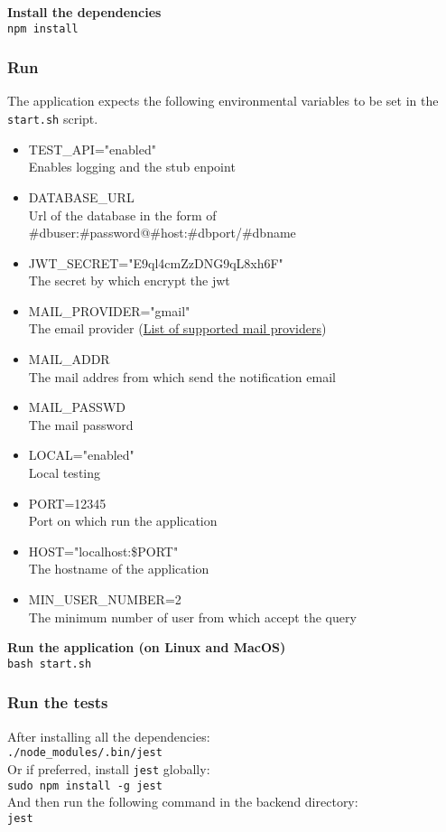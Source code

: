 \vspace{0.5em}
\noindent \textbf{Install the dependencies}\\
\texttt{npm install }\\
\vspace{0.3em}

\subsubsection{Run}
The application expects the following environmental variables to be set in the \texttt{start.sh} script.
\begin{itemize}
    \item TEST\_API="enabled"\\ Enables logging and the stub enpoint
    \item DATABASE\_URL \\ Url of the database in the form of \\\#dbuser:\#password@\#host:\#dbport/\#dbname
    \item JWT\_SECRET="E9ql4cmZzDNG9qL8xh6F"\\ The secret by which encrypt the jwt
    \item MAIL\_PROVIDER="gmail"\\ The email provider (\href{https://nodemailer.com/smtp/well-known/}{List of supported mail providers})
    \item MAIL\_ADDR\\ The mail addres from which send the notification email
    \item MAIL\_PASSWD\\ The mail password 
    \item LOCAL="enabled"\\ Local testing 
    \item PORT=12345 \\ Port on which run the application
    \item HOST="localhost:\${PORT}"\\ The hostname of the application
    \item MIN\_USER\_NUMBER=2\\ The minimum number of user from which accept the query
\end{itemize}
\vspace{0.3em}
\noindent \textbf{Run the application (on Linux and MacOS)} \\
\texttt{bash start.sh}

\subsubsection{Run the tests}
After installing all the dependencies: \\
\texttt{./node\_modules/.bin/jest} \\
Or if preferred, install \texttt{jest} globally: \\
\texttt{sudo npm install -g jest}\\
And then run the following command in the backend directory: \\
\texttt{jest}


